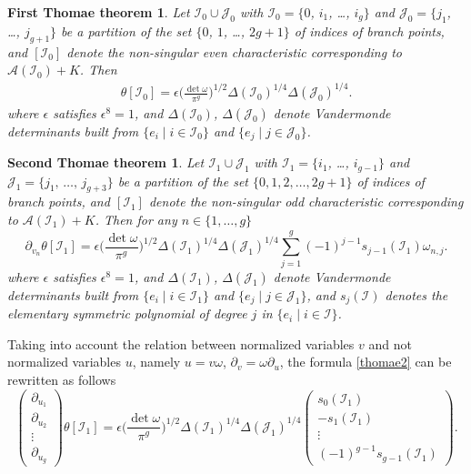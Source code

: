 \documentclass[twoside]{amsart}
\newcommand{\I}{\mathcal{I}}
\newcommand{\J}{\mathcal{J}}
\theoremstyle{definition}
\theoremstyle{plain}
\begin{document}
\newtheorem*{FTteo}{First Thomae theorem}
\begin{FTteo}
 Let $\I_0\cup \J_0$ with $\I_0=\{0$, $i_1$, \ldots, $i_{g}\}$ 
 and $\J_0 = \{j_1$, \ldots, $j_{g+1}\}$  be a partition
 of the set $\{0$, $1$, \ldots, $2g+1\}$ of indices of branch points, and  $[\I_0]$ denote 
 the non-singular even characteristic corresponding to $\mathcal{A} (\I_0) + K$.  Then
 \begin{gather}\label{thomae1}
 \theta[\I_0] = \epsilon \bigg(\frac{\det \omega}{\pi^g}\bigg)^{1/2} \Delta(\I_0)^{1/4} \Delta(\J_0)^{1/4}.
\end{gather}
where $\epsilon$ satisfies $\epsilon^8=1$,
and $\Delta(\I_0)$, $\Delta(\J_0)$ denote Vandermonde determinants 
built from $\{e_i\mid i\in \I_0\}$ and $\{e_j\mid j\in \J_0\}$.
\end{FTteo}


\newtheorem*{STteo}{Second Thomae theorem}
\begin{STteo}
 Let $\I_1\cup \J_1$ with $\I_1=\{i_1$, \ldots, $i_{g-1}\}$ and $\J_1 = \{j_1,\,\dots,\,j_{g+3}\}$ 
 be a partition of the set $\{0,1,2,\dots,2g+1\}$ of indices of branch points, and
 $[\I_1]$ denote the non-singular odd characteristic  
 corresponding to $\mathcal{A} (\I_1) + K$. Then for any $n \in \{1, \dots, g\}$
 \begin{equation}\label{thomae2}
 \partial_{v_n} \theta[\I_1] 
 = \epsilon \bigg(\frac{\det \omega}{\pi^g}\bigg)^{1/2} \Delta(\I_1)^{1/4} \Delta(\J_1)^{1/4} 
 \sum_{j=1}^g  (-1)^{j-1} s_{j-1}(\I_1) \omega_{n,j}.
\end{equation}
where  $\epsilon$ satisfies $\epsilon^8=1$, and $\Delta(\I_1)$, $\Delta(\J_1)$ denote
Vandermonde determinants built from $\{e_i\mid i\in \I_1\}$ and $\{e_j\mid j\in \J_1\}$,
and $s_{j}(\I)$ denotes the elementary symmetric polynomial of degree $j$ in $\{e_i\mid i\in \I\}$.
\end{STteo}

Taking into account the relation between normalized variables $v$ and not normalized variables $u$,
namely $u = v \omega$, $\partial_v = \omega \partial_u$,
the formula \eqref{thomae2} can be rewritten as follows
\begin{equation}\label{thomae2MFu}
 \begin{pmatrix} \partial_{u_1} \\ \partial_{u_2}  \\ \vdots \\ \partial_{u_{g}}  \end{pmatrix}  
 \theta[\I_1]
 =  \epsilon \bigg(\frac{\det \omega}{\pi^g}\bigg)^{1/2} \Delta(\I_1)^{1/4} \Delta(\J_1)^{1/4}
 \begin{pmatrix} s_0(\I_1) \\ - s_1(\I_1) \\ \vdots \\ (-1)^{g-1} s_{g-1}(\I_1) 
\end{pmatrix}.
\end{equation}
\end{document}
